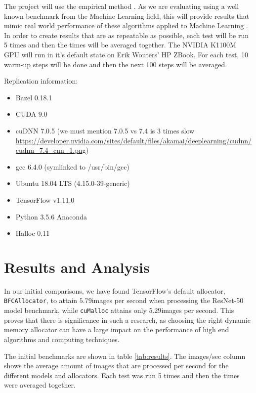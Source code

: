 \documentclass[12pt,twoside]{article}
\newcommand{\resnettimebfc}{$5.79$}     %
\newcommand{\resnettimecuda}{$5.29$}    %
\begin{document}
The project will use the empirical method \cite{bock2001}. As we are evaluating using a well known benchmark from the Machine Learning field, this will provide results that mimic real world performance of these algorithms applied to Machine Learning \cite{abadi2016}. In order to create results that are as repeatable as possible, each test will be run 5 times and then the times will be averaged together. The NVIDIA K1100M GPU will run in it's default state on Erik Wouters' HP ZBook. For each test, 10 warm-up steps will be done and then the next 100 steps will be averaged. 

Replication information:
\begin{itemize}
    \item Bazel 0.18.1
    \item CUDA 9.0
    \item cuDNN 7.0.5 (we must mention 7.0.5 vs 7.4 is 3 times slow \url{https://developer.nvidia.com/sites/default/files/akamai/deeplearning/cudnn/cudnn_7.4_cnn_1.png})
    \item gcc 6.4.0 (symlinked to /usr/bin/gcc)
    \item Ubuntu 18.04 LTS (4.15.0-39-generic)
    \item TensorFlow v1.11.0
    \item Python 3.5.6 Anaconda
    \item Halloc 0.11
\end{itemize}




\section{Results and Analysis}
\label{sec:results-and-analysis}

In our initial comparisons, we have found TensorFlow's default allocator, \texttt{BFCAllocator}, to attain \resnettimebfc images per second when processing the ResNet-50 model benchmark, while \texttt{cuMalloc} attains only \resnettimecuda images per second. This proves that there is significance in such a research, as choosing the right dynamic memory allocator can have a large impact on the performance of high end algorithms and computing techniques.

The initial benchmarks are shown in table \ref{tab:results}. The images/sec column shows the average amount of images that are processed per second for the different models and allocators. Each test was run 5 times and then the times were averaged together.
\end{document}
